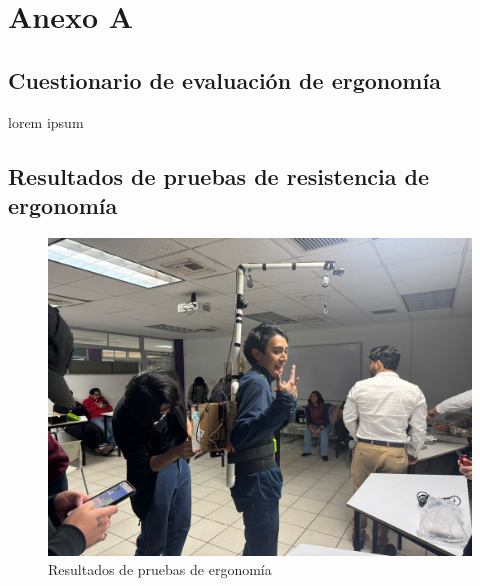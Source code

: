 


\chapter{Anexo A}
\section{Cuestionario de evaluación de ergonomía}
lorem ipsum

\section{Resultados de pruebas de resistencia de ergonomía}
\begin{figure}[H]
    \centering
    \includegraphics[width=1\textwidth]{img/PruebaErgonomica1.png}
    \caption{Resultados de pruebas de ergonomía}
    \label{fig:ergo-test}
\end{figure}

